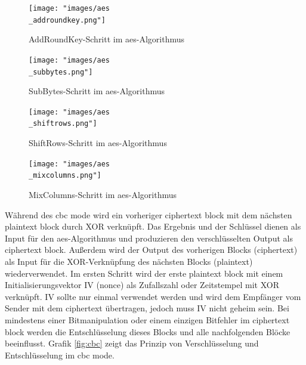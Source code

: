 \begin{figure}[!htbp]
	\centering
	\texttt{[image: "images/aes\\\_addroundkey.png"]}
	\caption{AddRoundKey-Schritt im \gls{aes}-Algorithmus \cite{wiki-aes}}
	\label{fig:aes-addk}
\end{figure}

\begin{figure}[!htbp]
	\centering
	\texttt{[image: "images/aes\\\_subbytes.png"]}
	\caption{SubBytes-Schritt im \gls{aes}-Algorithmus \cite{wiki-aes}}
	\label{fig:aes-sub}
\end{figure}

\begin{figure}[!htbp]
	\centering
	\texttt{[image: "images/aes\\\_shiftrows.png"]}
	\caption{ShiftRows-Schritt im \gls{aes}-Algorithmus \cite{wiki-aes}}
	\label{fig:aes-shift}
\end{figure}

\begin{figure}[!htbp]
	\centering
	\texttt{[image: "images/aes\\\_mixcolumns.png"]}
	\caption{MixColumns-Schritt im \gls{aes}-Algorithmus \cite{wiki-aes}}
	\label{fig:aes-mix}
\end{figure}

Während des \gls{cbc} mode wird ein vorheriger ciphertext block mit dem nächsten plaintext block durch XOR verknüpft. Das Ergebnis und der Schlüssel dienen als Input für den \gls{aes}-Algorithmus und produzieren den verschlüsselten Output als ciphertext block. Außerdem wird der Output des vorherigen Blocks (ciphertext) als Input für die XOR-Verknüpfung des nächsten Blocks (plaintext) wiederverwendet. Im ersten Schritt wird der erste plaintext block mit einem Initialisierungsvektor IV (nonce) als Zufallszahl oder Zeitstempel mit XOR verknüpft. IV sollte nur einmal verwendet werden und wird dem Empfänger vom Sender mit dem ciphertext übertragen, jedoch muss IV nicht geheim sein. Bei mindestens einer Bitmanipulation oder einem einzigen Bitfehler im ciphertext block werden die Entschlüsselung dieses Blocks und alle nachfolgenden Blöcke beeinflusst. Grafik \ref{fig:cbc} zeigt das Prinzip von Verschlüsselung und Entschlüsselung im \gls{cbc} mode. 

